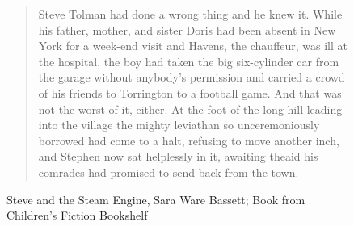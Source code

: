 \documentclass[]{article}
\begin{document}
\begin{figure}
	\begin{quotation}
		Steve Tolman had done a wrong thing and he knew it.
		While his father, mother, and sister Doris had been absent in New York for a week-end visit and Havens, the chauffeur, was ill at the hospital, the boy had taken the big six-cylinder car from the garage without anybody's permission and carried a crowd of his friends to Torrington to a football game. And that was not the worst of it, either. At the foot of the long hill leading into the village the mighty leviathan so unceremoniously borrowed had come to a halt, refusing to move another inch, and Stephen now sat helplessly in it, awaiting theaid his comrades had promised to send back from the town.
	\end{quotation}
	\label{figure:book2}
	\caption{Steve and the Steam Engine, Sara Ware Bassett; Book from Children's Fiction Bookshelf}
\end{figure}

\printbibliography
\end{document}
